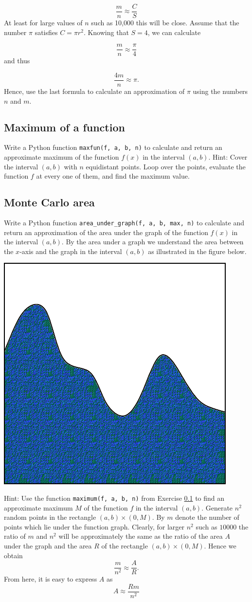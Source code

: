 $$
\frac{m}{n} \approx \frac{C}{S}
$$
At least for large values of $n$ such as 10,000 this will be close. 
Assume that the number $\pi$ satisfies $C = \pi r^2$. Knowing that $S = 4$, 
we can calculate

$$
\frac{m}{n} \approx \frac{\pi}{4}
$$ 
and thus 

$$
\frac{4m}{n} \approx \pi.
$$ 
Hence, use the last formula to calculate an approximation of $\pi$ using 
the numbers $n$ and $m$.


\subsection{Maximum of a function}\label{exe:maximum}

Write a Python function {\tt maxfun(f, a, b, n)} to calculate and return  
an approximate maximum of the function $f(x)$ in the interval $(a, b)$. Hint:
Cover the interval $(a, b)$ with $n$ equidistant points. Loop over the 
points, evaluate the function $f$ at every one of them, and find the maximum 
value.


\subsection{Monte Carlo area}

Write a Python function {\tt area\_under\_graph(f, a, b, max, n)} to calculate and return  
an approximation of the area under the graph of the function $f(x)$ in the interval $(a, b)$. By the area
under a graph we understand the area between the $x$-axis and the 
graph in the interval $(a, b)$ as illustrated in the figure below. 

\begin{center}
\includegraphics[height=0.3\textwidth]{img/prob2.png}
\end{center}
\noindent
Hint: Use the function {\tt maximum(f, a, b, n)} from Exercise \ref{exe:maximum}
to find an approximate maximum $M$ of the function $f$ in the interval $(a,b)$. 
Generate $n^2$ random points in the rectangle $(a, b)\times(0, M)$. By $m$ denote 
the number of points which lie under the function graph. Clearly, for larger
$n^2$ such as $10000$ the ratio of $m$ and $n^2$ will be approximately the same as 
the ratio of the area $A$ under the graph and the area $R$ of the rectangle $(a, b)\times(0, M)$. 
Hence we obtain 
$$
\frac{m}{n^2} \approx \frac{A}{R}.
$$
From here, it is easy to express $A$ as
$$
A \approx \frac{Rm}{n^2}
$$

